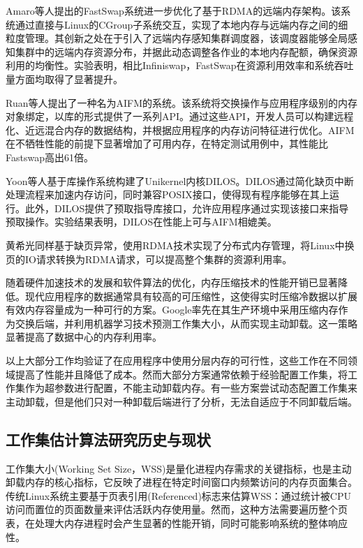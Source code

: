 Amaro等人提出的FastSwap系统进一步优化了基于RDMA的远端内存架构。该系统通过直接与Linux的CGroup子系统交互，实现了本地内存与远端内存之间的细粒度管理。其创新之处在于引入了远端内存感知集群调度器，该调度器能够全局感知集群中的远端内存资源分布，并据此动态调整各作业的本地内存配额，确保资源利用的均衡性。实验表明，相比Infiniswap，FastSwap在资源利用效率和系统吞吐量方面均取得了显著提升。

Ruan等人提出了一种名为AIFM的系统。该系统将交换操作与应用程序级别的内存对象绑定，以库的形式提供了一系列API。通过这些API，开发人员可以构建远程化、近远混合内存的数据结构，并根据应用程序的内存访问特征进行优化。AIFM在不牺牲性能的前提下显著增加了可用内存，在特定测试用例中，其性能比Fastswap高出61倍。

Yoon等人基于库操作系统构建了Unikernel内核DILOS。DILOS通过简化缺页中断处理流程来加速内存访问，同时兼容POSIX接口，使得现有程序能够在其上运行。此外，DILOS提供了预取指导库接口，允许应用程序通过实现该接口来指导预取操作。实验结果表明，DILOS在性能上可与AIFM相媲美。

黄希光同样基于缺页异常，使用RDMA技术实现了分布式内存管理，将Linux中换页的IO请求转换为RDMA请求，可以提高整个集群的资源利用率。

随着硬件加速技术的发展和软件算法的优化，内存压缩技术的性能开销已显著降低。现代应用程序的数据通常具有较高的可压缩性，这使得实时压缩冷数据以扩展有效内存容量成为一种可行的方案。Google率先在其生产环境中采用压缩内存作为交换后端，并利用机器学习技术预测工作集大小，从而实现主动卸载。这一策略显著提高了数据中心的内存利用率。

以上大部分工作均验证了在应用程序中使用分层内存的可行性，这些工作在不同领域提高了性能并且降低了成本。然而大部分方案通常依赖于经验配置工作集，将工作集作为超参数进行配置，不能主动卸载内存。有一些方案尝试动态配置工作集来主动卸载，但是他们只对一种卸载后端进行了分析，无法自适应于不同卸载后端。

\subsection{工作集估计算法研究历史与现状}
\label{sec:工作集估计算法研究历史与现状}

工作集大小(Working Set Size，WSS)是量化进程内存需求的关键指标，也是主动卸载内存的核心指标，它反映了进程在特定时间窗口内频繁访问的内存页面集合。传统Linux系统主要基于页表引用(Referenced)标志来估算WSS：通过统计被CPU访问而置位的页面数量来评估活跃内存使用量。然而，这种方法需要遍历整个页表，在处理大内存进程时会产生显著的性能开销，同时可能影响系统的整体响应性。


